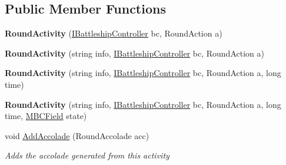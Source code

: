 \subsection*{Public Member Functions}
\begin{DoxyCompactItemize}
\item 
\hypertarget{class_m_b_c_core_1_1_m_b_c_round_log_1_1_round_activity_acfa09beea7ae832ffdc3ea85ee356335}{{\bfseries Round\-Activity} (\hyperlink{interface_m_b_c_core_1_1_i_battleship_controller}{I\-Battleship\-Controller} bc, Round\-Action a)}\label{class_m_b_c_core_1_1_m_b_c_round_log_1_1_round_activity_acfa09beea7ae832ffdc3ea85ee356335}

\item 
\hypertarget{class_m_b_c_core_1_1_m_b_c_round_log_1_1_round_activity_a4f17bf21fd1f4f102aa73290d90d4f73}{{\bfseries Round\-Activity} (string info, \hyperlink{interface_m_b_c_core_1_1_i_battleship_controller}{I\-Battleship\-Controller} bc, Round\-Action a)}\label{class_m_b_c_core_1_1_m_b_c_round_log_1_1_round_activity_a4f17bf21fd1f4f102aa73290d90d4f73}

\item 
\hypertarget{class_m_b_c_core_1_1_m_b_c_round_log_1_1_round_activity_a41eeb3a434f94a4753641dd180b7311c}{{\bfseries Round\-Activity} (string info, \hyperlink{interface_m_b_c_core_1_1_i_battleship_controller}{I\-Battleship\-Controller} bc, Round\-Action a, long time)}\label{class_m_b_c_core_1_1_m_b_c_round_log_1_1_round_activity_a41eeb3a434f94a4753641dd180b7311c}

\item 
\hypertarget{class_m_b_c_core_1_1_m_b_c_round_log_1_1_round_activity_a71874670cb8cdf599a6d6e91b3a004c5}{{\bfseries Round\-Activity} (string info, \hyperlink{interface_m_b_c_core_1_1_i_battleship_controller}{I\-Battleship\-Controller} bc, Round\-Action a, long time, \hyperlink{class_m_b_c_core_1_1_m_b_c_field}{M\-B\-C\-Field} state)}\label{class_m_b_c_core_1_1_m_b_c_round_log_1_1_round_activity_a71874670cb8cdf599a6d6e91b3a004c5}

\item 
\hypertarget{class_m_b_c_core_1_1_m_b_c_round_log_1_1_round_activity_a68c7d660136ebe55c2f79aa29ef3951b}{void \hyperlink{class_m_b_c_core_1_1_m_b_c_round_log_1_1_round_activity_a68c7d660136ebe55c2f79aa29ef3951b}{Add\-Accolade} (Round\-Accolade acc)}\label{class_m_b_c_core_1_1_m_b_c_round_log_1_1_round_activity_a68c7d660136ebe55c2f79aa29ef3951b}

\begin{DoxyCompactList}\small\item\em Adds the accolade generated from this activity\end{DoxyCompactList}\end{DoxyCompactItemize}
